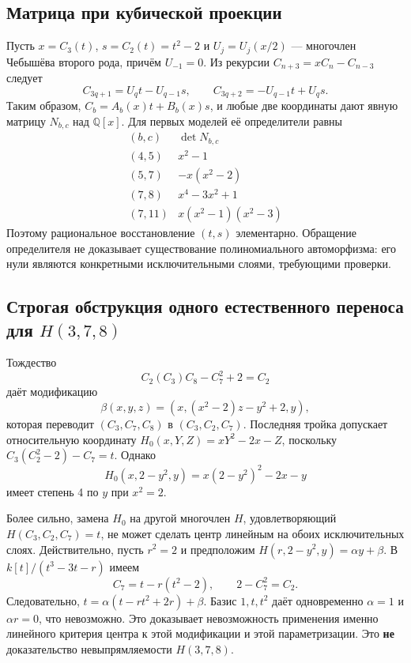\subsection{Матрица при кубической проекции}
Пусть $x=C_3(t)$, $s=C_2(t)=t^2-2$ и
$U_j=U_j(x/2)$ --- многочлен Чебышёва второго рода, причём $U_{-1}=0$.
Из рекурсии $C_{n+3}=xC_n-C_{n-3}$ следует
\[
 C_{3q+1}=U_qt-U_{q-1}s,\qquad
 C_{3q+2}=-U_{q-1}t+U_qs.
\]
Таким образом, $C_b=A_b(x)t+B_b(x)s$, и любые две координаты
дают явную матрицу $N_{b,c}$ над $\mathbb Q[x]$.
Для первых моделей её определители равны
\[
\begin{array}{c|c}
(b,c)&\det N_{b,c}\\\hline
(4,5)&x^2-1\\
(5,7)&-x(x^2-2)\\
(7,8)&x^4-3x^2+1\\
(7,11)&x(x^2-1)(x^2-3)
\end{array}
\]
Поэтому рациональное восстановление $(t,s)$ элементарно. Обращение
определителя не доказывает существование полиномиального автоморфизма:
его нули являются конкретными исключительными слоями, требующими
проверки.

\subsection{Строгая обструкция одного естественного переноса для $H(3,7,8)$}
Тождество
\[
 C_2(C_3)C_8-C_7^2+2=C_2
\]
даёт модификацию
\[
 \beta(x,y,z)=(x,(x^2-2)z-y^2+2,y),
\]
которая переводит $(C_3,C_7,C_8)$ в $(C_3,C_2,C_7)$.
Последняя тройка допускает относительную координату
$H_0(x,Y,Z)=xY^2-2x-Z$, поскольку
$C_3(C_2^2-2)-C_7=t$. Однако
\[
 H_0(x,2-y^2,y)=x(2-y^2)^2-2x-y
\]
имеет степень 4 по $y$ при $x^2=2$.

Более сильно, замена $H_0$ на другой многочлен $H$, удовлетворяющий
$H(C_3,C_2,C_7)=t$, не может сделать центр линейным на обоих
исключительных слоях. Действительно, пусть $r^2=2$ и предположим
$H(r,2-y^2,y)=\alpha y+\beta$.
В $k[t]/(t^3-3t-r)$ имеем
\[
 C_7=t-r(t^2-2),\qquad 2-C_7^2=C_2.
\]
Следовательно, $t=\alpha(t-rt^2+2r)+\beta$.
Базис $1,t,t^2$ даёт одновременно $\alpha=1$ и $\alpha r=0$,
что невозможно. Это доказывает невозможность применения именно
линейного критерия центра к этой модификации и этой параметризации.
Это \textbf{не} доказательство невыпрямляемости $H(3,7,8)$.

